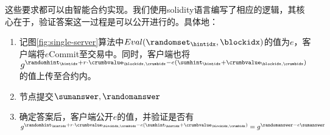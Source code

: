 这些要求都可以由智能合约实现。我们使用solidity语言编写了相应的逻辑，其核心在于，验证答案这一过程是可以公开进行的。具体地：
\begin{enumerate}
    \item 记图\ref{fig:single-server}算法中$Eval(\randomset_\hintidx, \blockidx)$的值为$e$，客户端将$e$Commit至交易中。同时，客户端也将$g^{\randomhint_\hintidx+r\cdot \crumbvalue_{\blockidx, \crumbidx}-e(\sumhint_\hintidx+\crumbvalue_{\blockidx, \crumbidx})}$的值上传至合约内。
    \item 节点提交$\sumanswer,\randomanswer$
    \item 确定答案后，客户端公开$e$的值，并验证是否有$g^{\randomhint_\hintidx+r\cdot \crumbvalue_{\blockidx, \crumbidx}-e(\sumhint_\hintidx+\crumbvalue_{\blockidx, \crumbidx})}=g^{\randomanswer-e\sumanswer}$
\end{enumerate}


